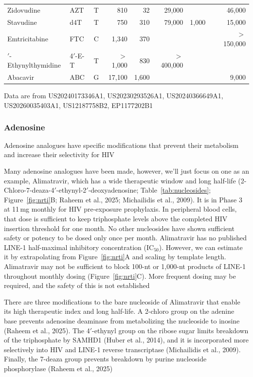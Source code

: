 \documentclass[11pt,twocolumn,twoside]{extarticle}
\begin{document}
\begin{table}[!t]
\begin{tabular}{@{}>{\raggedright\arraybackslash}p{6.05cm} l c r r r r r r@{}}
Zidovudine & AZT & T & 810 & 32 & 29,000 &  &  & 46,000 \\
Stavudine & d4T & T & 750 & 310 & 79,000 & 1,000 &  & 15,000 \\
Emtricitabine & FTC & C & 1,340 & 370 &  &  &  & $>$150,000 \\
4$'$-Ethynylthymidine & 4$'$-E-T & T & $>$1,000 & 830 & $>$400,000 &  &  &  \\
Abacavir & ABC & G & 17,100 & 1,600 &  &  &  & 9,000 \\
\bottomrule
\end{tabular}
\par\vspace{0.35em}
{\raggedright\footnotesize Data are from US20240173346A1, US20230293526A1, US20240366649A1, US20260035403A1, US12187758B2, EP1177202B1\cite{raheem,kawamoto,kodama,takamatsu,lin,nitanda,hachiya,parkin,ohrui,nakata,haraguchi,yangpol,baldwin,callebaut}\par}
\end{table}

\subsubsection{Adenosine}
Adenosine analogues have specific modifications that prevent their metabolism and increase their selectivity for HIV

Many adenosine analogues have been made, however, we'll just focus on one as an example, Alimatravir, which has a wide therapeutic window and long half-life (2-Chloro-7-deaza-4$'$-ethynyl-2$'$-deoxyadenosine; Table~\ref{tab:nucleosides}; Figure~\ref{fig:nrti}B; Raheem et al., 2025; Michailidis et al., 2009). It is in Phase 3 at 11\,mg monthly for HIV pre-exposure prophylaxis. In peripheral blood cells, that dose is sufficient to keep triphosphate levels above the completed HIV insertion threshold for one month. No other nucleosides have shown sufficient safety or potency to be dosed only once per month. Alimatravir has no published LINE-1 half-maximal inhibitory concentration (IC$_{50}$). However, we can estimate it by extrapolating from Figure~\ref{fig:nrti}A and scaling by template length. Alimatravir may not be sufficient to block 100-nt or 1,000-nt products of LINE-1 throughout monthly dosing (Figure~\ref{fig:nrti}C). More frequent dosing may be required, and the safety of this is not established

There are three modifications to the bare nucleoside of Alimatravir that enable its high therapeutic index and long half-life. A 2-chloro group on the adenine base prevents adenosine deaminase from metabolizing the nucleoside to inosine (Raheem et al., 2025). The 4$'$-ethynyl group on the ribose sugar limits breakdown of the triphosphate by SAMHD1 (Huber et al., 2014), and it is incorporated more selectively into HIV and LINE-1 reverse transcriptase (Michailidis et al., 2009). Finally, the 7-deaza group prevents breakdown by purine nucleoside phosphorylase (Raheem et al., 2025)
\end{document}
